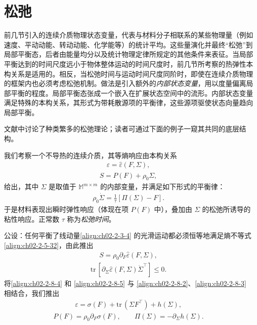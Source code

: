\documentclass[../../main.tex]{subfiles}
\begin{document}
\section{松弛}\label{section:ch02-松弛}

前几节引入的连续介质物理状态变量，代表与材料分子相联系的某些物理量（例如速度、平动动能、转动动能、化学能等）的统计平均。这些量演化并最终“松弛”到局部平衡态，后者由能量均分以及统计物理定律所规定的其他条件来表征。当局部平衡达到的时间尺度远小于物体整体运动的时间尺度时，前几节所考察的热弹性本构关系是适用的。相反，当松弛时间与运动时间尺度同阶时，即使在连续介质物理的框架内也必须考虑松弛机制。做法是引入额外的\emph{内部状态变量}，用以度量偏离局部平衡的程度。局部平衡态张成一个嵌入在扩展状态空间中的流形。内部状态变量满足特殊的本构关系，其形式为带耗散源项的平衡律，这些源项驱使状态向量趋向局部平衡。

文献中讨论了种类繁多的松弛理论；读者可通过下面的例子一窥其共同的底层结构。

我们考察一个不导热的连续介质，其等熵响应由本构关系
\begin{align}
\varepsilon=\hat{\varepsilon}(F,\Sigma),
\label{align:ch02-2-8-1}
\end{align}
\begin{align}
S=P(F)+\rho_{0}\Sigma,
\label{align:ch02-2-8-2}
\end{align}
给出，其中 $\Sigma$ 是取值于 $\mathbb{M}^{m\times m}$ 的内部变量，并满足如下形式的平衡律：
\begin{align}
\rho_{0}\dot{\Sigma}=\frac{1}{\tau}[\Pi(\Sigma)-F].
\label{align:ch02-2-8-3}
\end{align}
于是材料表现出瞬时弹性响应（体现在项 $P(F)$ 中），叠加由 $\Sigma$ 的松弛所诱导的粘性响应。正常数 $\tau$ 称为\emph{松弛时间}。

公设：任何平衡了线动量\eqref{align:ch02-2-3-4} 的光滑运动都必须恒等地满足熵不等式\eqref{align:ch02-2-5-32}，由此推出
\begin{align}
S=\rho_{0}\partial_{F}\hat{\varepsilon}(F,\Sigma),
\label{align:ch02-2-8-4}
\end{align}
\begin{align}
\mathrm{tr}\,[\partial_{\Sigma}\hat{\varepsilon}(F,\Sigma)\dot{\Sigma}^{\top}]\leqslant 0.
\label{align:ch02-2-8-5}
\end{align}
将\eqref{align:ch02-2-8-4} 和 \eqref{align:ch02-2-8-5} 与 \eqref{align:ch02-2-8-2}、\eqref{align:ch02-2-8-3} 相结合，我们推出
\begin{align}
\varepsilon=\sigma(F)+\mathrm{tr}\,(\Sigma F^{\top})+h(\Sigma),
\label{align:ch02-2-8-6}
\end{align}
\begin{align}
P(F)=\rho_{0}\partial_{F}\sigma(F),\qquad\Pi(\Sigma)=-\partial_{\Sigma}h(\Sigma).
\label{align:ch02-2-8-7}
\end{align}
\end{document}
